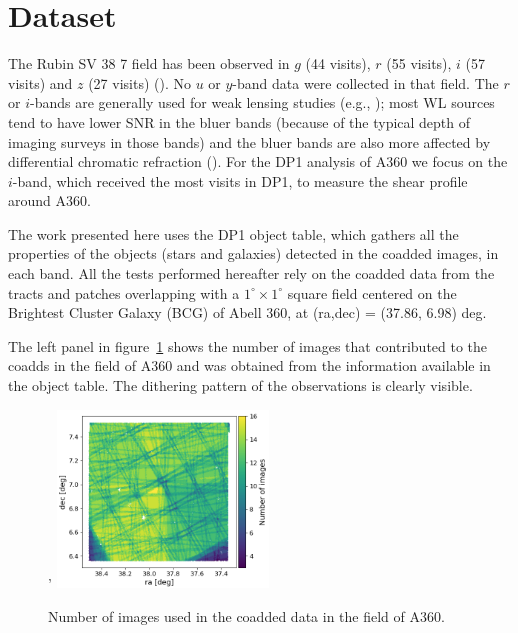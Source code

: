 \documentclass[SE,lsstdraft,authoryear,toc]{lsstdoc}
\begin{document}
\section{Dataset}
\label{sec:data}
The Rubin SV 38 7 field has been observed in $g$ (44 visits), $r$ (55 visits), $i$ (57 visits) and $z$ (27 visits) (). No $u$ or $y$-band data were collected in that field. The $r$ or $i$-bands are generally used for weak lensing studies (e.g., \citealp{2018MNRAS.481.3170M}); most WL sources tend to have lower SNR in the bluer bands (because of the typical depth of imaging surveys in those bands) and the bluer bands are also more affected by differential chromatic refraction (). For the DP1 analysis of A360 we focus on the $i$-band, which received the most visits in DP1, to measure the shear profile around A360. 

The work presented here uses the DP1 object table, which gathers all the properties of the objects (stars and galaxies) detected in the coadded images, in each band.
All the tests performed hereafter rely on the coadded data from the tracts and patches overlapping with a $1^\circ \times 1^\circ$ square field centered on the Brightest Cluster Galaxy (BCG) of Abell 360, at (ra,dec) = (37.86, 6.98) deg. 


 The left panel in figure~\ref{fig:dither} shows the number of images that contributed to the coadds in the field of A360 and was obtained from the  information available in the object table. The dithering pattern of the observations is clearly visible. 


\begin{figure}
\centering'
\includegraphics[width=0.5\textwidth]{Figures/nimages.png}
\caption{Number of images used in the coadded data in the field of A360.\label{fig:dither}}
\end{figure}
\end{document}
